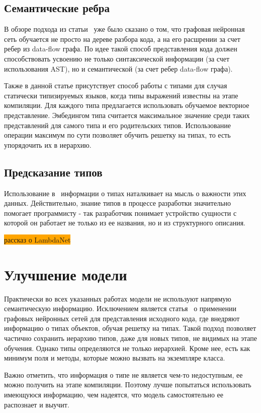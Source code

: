 \documentclass[times,specification,annotation]{itmo-student-thesis}
\begin{document}
\subsection{Семантические ребра}\label{sec:semanticEdges}
В обзоре подхода из статьи~\cite{gated-graphs-nn} уже было сказано о том, что графовая нейронная сеть обучается не просто на дереве разбора кода, а на его расшрении за счет ребер из data-flow графа. По идее такой способ представления кода должен способствовать усвоению не только синтаксической информации (за счет использования AST), но и семантической (за счет ребер data-flow графа).

Также в данной статье присутствует способ работы с типами для случая статически типизируемых языков, когда типы выражений известны на этапе компиляции. Для каждого типа предлагается использовать обучаемое векторное представление. Эмбедингом типа считается максимальное значение среди таких представлений для самого типа и его родительских типов. Использование операции максимум по сути позволяет обучить решетку на типах, то есть упорядочить их в иерархию.

\subsection{Предсказание типов}\label{sec:lambdanet}
Использование в~\cite{gated-graphs-nn} информации о типах наталкивает на мысль о важности этих данных. Действительно, знание типов в процессе разработки значительно помогает программисту - так разработчик понимает устройство сущности с которой он работает не только из ее названия, но и из структурного описания. 

\colorbox{orange}{рассказ о LambdaNet}


\section{Улучшение модели}\label{sec:improve}
Практически во всех указанных работах модели не используют напрямую семантическую информацию. Исключением является статья~\cite{gated-graphs-nn} о применении графовых нейронных сетей для представления исходного кода, где внедряют информацию о типах объектов, обучая решетку на типах. Такой подход позволяет частично сохранить иерархию типов, даже для новых типов, не видимых на этапе обучения. Однако типы определяются не только иерархией. Кроме нее, есть как минимум поля и методы, которые можно вызвать на экземпляре класса.

Важно отметить, что информация о типе не является чем-то недоступным, ее можно получить на этапе компиляции. Поэтому лучше попытаться использовать имеющуюся информацию, чем надеятся, что модель самостоятельно ее распознает и выучит.
\end{document}
